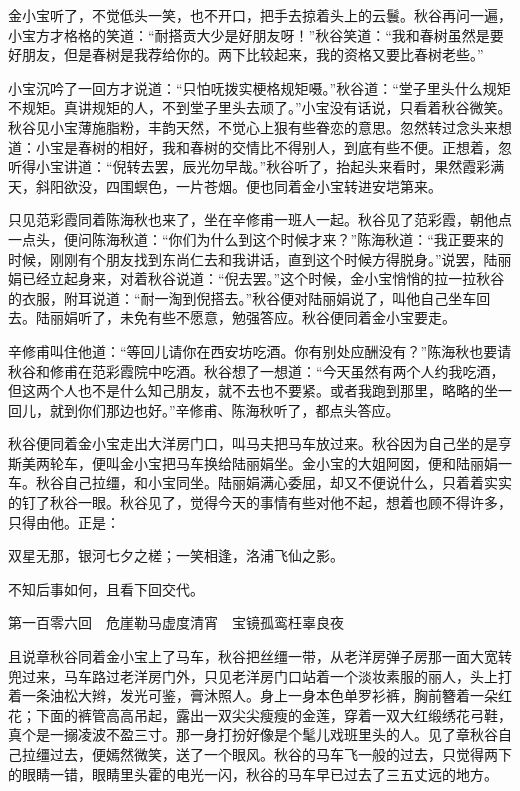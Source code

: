 \documentclass[12pt,UTF8]{ctexbook}
\begin{document}
{{{金小宝听了，不觉低头一笑，也不开口，把手去掠着头上的云鬟。秋谷再问一遍，小宝方才格格的笑道：“耐搭贡大少是好朋友呀！”秋谷笑道：“我和春树虽然是要好朋友，但是春树是我荐给你的。两下比较起来，我的资格又要比春树老些。”

小宝沉吟了一回方才说道：“只怕呒拨实梗格规矩嗫。”秋谷道：“堂子里头什么规矩不规矩。真讲规矩的人，不到堂子里头去顽了。”小宝没有话说，只看着秋谷微笑。秋谷见小宝薄施脂粉，丰韵天然，不觉心上狠有些眷恋的意思。忽然转过念头来想道：小宝是春树的相好，我和春树的交情比不得别人，到底有些不便。正想着，忽听得小宝讲道：“倪转去罢，辰光勿早哉。”秋谷听了，抬起头来看时，果然霞彩满天，斜阳欲没，四围螟色，一片苍烟。便也同着金小宝转进安垲第来。

只见范彩霞同着陈海秋也来了，坐在辛修甫一班人一起。秋谷见了范彩霞，朝他点一点头，便问陈海秋道：“你们为什么到这个时候才来？”陈海秋道：“我正要来的时候，刚刚有个朋友找到东尚仁去和我讲话，直到这个时候方得脱身。”说罢，陆丽娟已经立起身来，对着秋谷说道：“倪去罢。”这个时候，金小宝悄悄的拉一拉秋谷的衣服，附耳说道：“耐一淘到倪搭去。”秋谷便对陆丽娟说了，叫他自己坐车回去。陆丽娟听了，未免有些不愿意，勉强答应。秋谷便同着金小宝要走。

辛修甫叫住他道：“等回儿请你在西安坊吃酒。你有别处应酬没有？”陈海秋也要请秋谷和修甫在范彩霞院中吃酒。秋谷想了一想道：“今天虽然有两个人约我吃酒，但这两个人也不是什么知己朋友，就不去也不要紧。或者我跑到那里，略略的坐一回儿，就到你们那边也好。”辛修甫、陈海秋听了，都点头答应。

秋谷便同着金小宝走出大洋房门口，叫马夫把马车放过来。秋谷因为自己坐的是亨斯美两轮车，便叫金小宝把马车换给陆丽娟坐。金小宝的大姐阿囡，便和陆丽娟一车。秋谷自己拉缰，和小宝同坐。陆丽娟满心委屈，却又不便说什么，只着着实实的钉了秋谷一眼。秋谷见了，觉得今天的事情有些对他不起，想着也顾不得许多，只得由他。正是：

双星无那，银河七夕之槎；一笑相逢，洛浦飞仙之影。

不知后事如何，且看下回交代。





第一百零六回　危崖勒马虚度清宵　宝镜孤鸾枉辜良夜





且说章秋谷同着金小宝上了马车，秋谷把丝缰一带，从老洋房弹子房那一面大宽转兜过来，马车路过老洋房门外，只见老洋房门口站着一个淡妆素服的丽人，头上打着一条油松大辫，发光可鉴，膏沐照人。身上一身本色单罗衫裤，胸前簪着一朵红花；下面的裤管高高吊起，露出一双尖尖瘦瘦的金莲，穿着一双大红缎绣花弓鞋，真个是一搦凌波不盈三寸。那一身打扮好像是个髦儿戏班里头的人。见了章秋谷自己拉缰过去，便嫣然微笑，送了一个眼风。秋谷的马车飞一般的过去，只觉得两下的眼睛一错，眼睛里头霍的电光一闪，秋谷的马车早已过去了三五丈远的地方。

}}}
\end{document}
